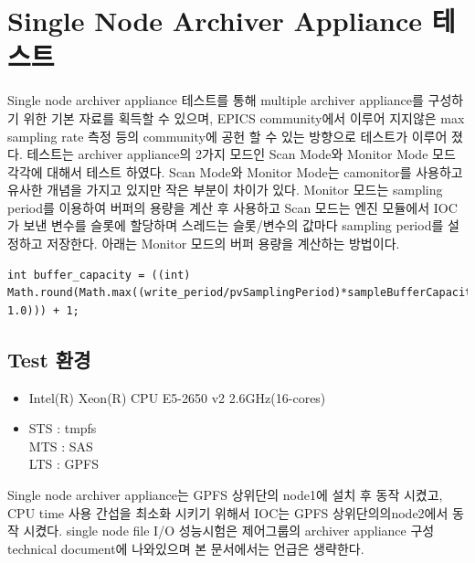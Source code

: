 \documentclass[11pt
  , a4paper
  , article
  , oneside
]{memoir}
\begin{document}
	\clearpage
	
	\section{Single Node Archiver Appliance 테스트}
	Single node archiver appliance 테스트를 통해 multiple archiver appliance를 구성하기 위한 기본 자료를 획득할 수 있으며, EPICS community에서 이루어 지지않은 max sampling rate 측정 등의 community에 공헌 할 수 있는 방향으로 테스트가 이루어 졌다. 테스트는 archiver appliance의 2가지 모드인 Scan Mode와 Monitor Mode 모드 각각에 대해서 테스트 하였다. Scan Mode와 Monitor Mode는 camonitor를 사용하고 유사한 개념을 가지고 있지만 작은 부분이 차이가 있다. Monitor 모드는 sampling period를 이용하여 버퍼의 용량을 계산 후 사용하고 Scan 모드는 엔진 모듈에서 IOC가 보낸 변수를 슬롯에 할당하며 스레드는 슬롯/변수의 값마다 sampling period를 설정하고 저장한다. 아래는 Monitor 모드의 버퍼 용량을 계산하는 방법이다.
	
	\begin{lstlisting}[style=termstyle]
	int buffer_capacity = ((int) Math.round(Math.max((write_period/pvSamplingPeriod)*sampleBufferCapacityAdjustment, 1.0))) + 1;
\end{lstlisting}
	\subsection{Test 환경}
	\begin{itemize}
		\item Intel(R) Xeon(R) CPU E5-2650 v2 2.6GHz(16-cores)
		\item STS : tmpfs\\
		MTS : SAS\\
		LTS : GPFS
	\end{itemize}
	
	Single node archiver appliance는 GPFS 상위단의 node1에 설치 후 동작 시켰고, CPU time 사용 간섭을 최소화 시키기 위해서 IOC는 GPFS 상위단의의node2에서 동작 시켰다. single node file I/O 성능시험은 제어그룹의 archiver appliance 구성 technical document에 나와있으며 본 문서에서는 언급은 생략한다.
	
\end{document}
